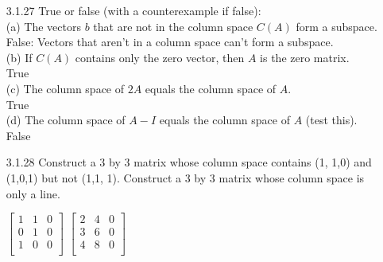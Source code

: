 \documentclass[10pt,twoside,reqno]{article}
\begin{document}
\begin{enumerate}
{\vspace{3mm}
}
\item[3.1.27] True or false (with a counterexample if false): \\ \vspace{1mm}
{\addtolength{\leftskip}{5mm}
(a) The vectors $b$ that are not in the column space $C (A)$ form a subspace. \\ \vspace{1mm}
\vspace{3mm}
False: Vectors that aren't in a column space can't form a subspace.\\
\vspace{3mm}
(b) If $C (A)$ contains only the zero vector, then $A$ is the zero matrix.\\ \vspace{1mm} 
\vspace{3mm}
True\\
\vspace{3mm}
(c) The column space of $2A$ equals the column space of $A$. \\ \vspace{1mm}
\vspace{3mm}
True\\
\vspace{3mm}
(d) The column space of $A - I$ equals the column space of $A$ (test this).\\ \vspace{1mm}
\vspace{3mm}
False\\
\vspace{3mm}
}

\item[3.1.28] Construct a 3 by 3 matrix whose column space contains (1, 1,0) and (1,0,1) but not (1,1, 1). Construct a 3 by 3 matrix whose column space is only a line. \\
\vspace{3mm}
\begin{center}
$
$$
\begin{bmatrix}
1&1&0\\
0&1&0\\
1&0&0\\
\end{bmatrix}
$$
$
\hspace{10mm}
$
$$
\begin{bmatrix}
2&4&0\\
3&6&0\\
4&8&0\\
\end{bmatrix}
$$
$
\end{center}


\end{enumerate}
\end{document}

